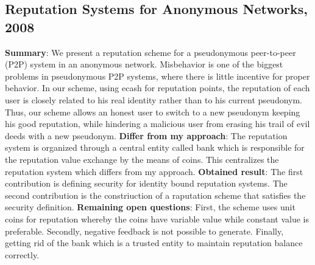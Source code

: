 \documentclass[11pt]{article}
\begin{document}
\subsection{Reputation Systems for Anonymous Networks, 2008 \cite{reputationSystemAnonymous}}
\textbf{Summary}: We present a reputation scheme for a pseudonymous peer-to-peer (P2P) system in an anonymous network. Misbehavior is one of the biggest problems in pseudonymous P2P systems, where there is little incentive for proper behavior. In our scheme, using ecash for reputation points, the reputation of each user is closely related to his real identity rather than to his current pseudonym. Thus, our scheme allows an honest user to switch to a new pseudonym keeping his good reputation, while hindering a malicious user from erasing his trail of evil deeds with a new pseudonym.\newline
\textbf{Differ from my approach}: The reputation system is organized through a central entity called bank which is responsible for the reputation value exchange by the means of coins. This centralizes the reputation system which differs from my approach. \newline
\textbf{Obtained result}: The first contribution is defining security for identity bound reputation systems. The second contribution is the constriuction of a raputation scheme that satisfies the security definition.\newline
\textbf{Remaining open questions}: First, the scheme uses unit coins for reputation whereby the coins have variable value while constant value is preferable. Secondly, negative feedback is not possible to generate. Finally, getting rid of the bank which is a trusted entity to maintain reputation balance correctly.\newline
\end{document}

